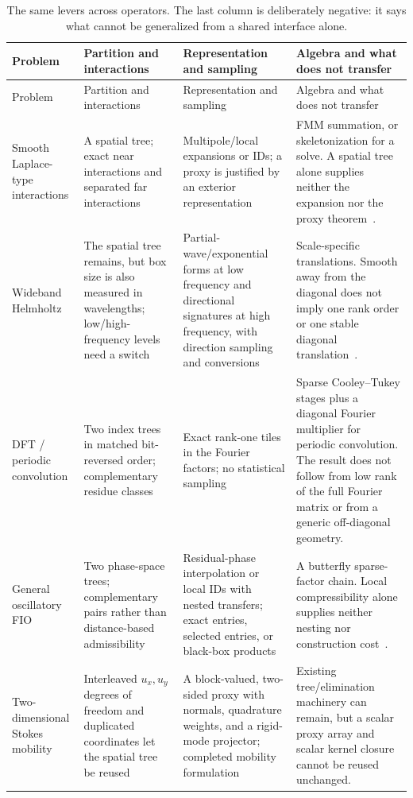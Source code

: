 \documentclass[11pt,a4paper]{article}
\begin{document}
{\footnotesize
\begin{longtable}{@{}>{\raggedright\arraybackslash}p{}>{\raggedright\arraybackslash}p{}>{\raggedright\arraybackslash}p{}>{\raggedright\arraybackslash}p{}@{}}
\caption{The same levers across operators. The last column is deliberately negative: it says what cannot be generalized from a shared interface alone.}
\label{tab:lever-translation}\\
\toprule
Problem & Partition and interactions & Representation and sampling & Algebra and what does not transfer\\
\midrule
\endfirsthead
\toprule
Problem & Partition and interactions & Representation and sampling & Algebra and what does not transfer\\
\midrule
\endhead
Smooth Laplace-type interactions & A spatial tree; exact near interactions and separated far interactions & Multipole/local expansions or IDs; a proxy is justified by an exterior representation & FMM summation, or skeletonization for a solve. A spatial tree alone supplies neither the expansion nor the proxy theorem~\cite{greengard1987fmm,ho2012hife}.\\
Wideband Helmholtz & The spatial tree remains, but box size is also measured in wavelengths; low/high-frequency levels need a switch & Partial-wave/exponential forms at low frequency and directional signatures at high frequency, with direction sampling and conversions & Scale-specific translations. Smooth away from the diagonal does not imply one rank order or one stable diagonal translation~\cite{cheng2006wideband}.\\
DFT / periodic convolution & Two index trees in matched bit-reversed order; complementary residue classes & Exact rank-one tiles in the Fourier factors; no statistical sampling & Sparse Cooley--Tukey stages plus a diagonal Fourier multiplier for periodic convolution. The result does not follow from low rank of the full Fourier matrix or from a generic off-diagonal geometry.\\
General oscillatory FIO & Two phase-space trees; complementary pairs rather than distance-based admissibility & Residual-phase interpolation or local IDs with nested transfers; exact entries, selected entries, or black-box products & A butterfly sparse-factor chain. Local compressibility alone supplies neither nesting nor construction cost~\cite{candes2009butterfly,li2015butterfly}.\\
Two-dimensional Stokes mobility & Interleaved $u_x,u_y$ degrees of freedom and duplicated coordinates let the spatial tree be reused & A block-valued, two-sided proxy with normals, quadrature weights, and a rigid-mode projector; completed mobility formulation~\cite{rachh2016mobility} & Existing tree/elimination machinery can remain, but a scalar proxy array and scalar kernel closure cannot be reused unchanged.\\

\end{longtable}}
\end{document}
